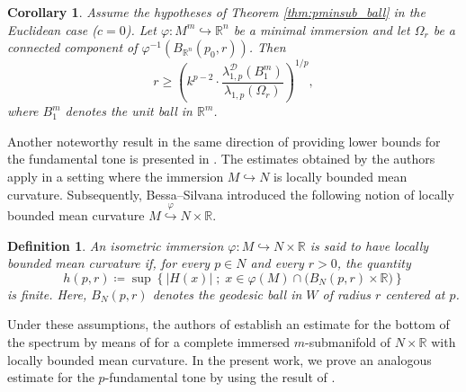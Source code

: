 \documentclass{article}
\newtheorem{cor}[thm]{Corollary}
\newtheorem{definition}[thm]{Definition}
\begin{document}
\begin{cor}\label{radiuscor}
Assume the hypotheses of Theorem \ref{thm:pminsub_ball}
in the Euclidean case ($c=0$).
Let $\varphi : M^m \hookrightarrow \mathbb{R}^n$ be a minimal immersion and let 
$\Omega_{r}$ be a connected component of 
$\varphi^{-1}(B_{\mathbb{R}^n}(p_0,r))$.
Then
\[
r \geq \left( k^{p-2} \cdot \frac{\lambda_{1,p}^{\mathcal D}(B_1^m)}{\lambda_{1,p}(\Omega_{r})}\right)^{1/p},
\]
where $B_1^m$ denotes the unit ball in $\mathbb{R}^m$.
\end{cor} 

Another noteworthy result in the same direction of providing lower bounds for the fundamental tone is presented in \cite{BessaMontenegro2003}. The estimates obtained by the authors apply in a setting where the immersion $M \hookrightarrow N$ is locally bounded mean curvature. 
Subsequently, Bessa--Silvana \cite[Definition 1.5]{Bessa-Silvana} introduced the following notion of locally  bounded mean curvature $M \stackrel{\varphi}{\hookrightarrow} N\times\mathbb{R} $.
\begin{definition}
An isometric immersion $\varphi \colon M \hookrightarrow N \times \mathbb{R}$ is said to have locally bounded mean curvature if, for every $p \in N$ and every $r>0$, the quantity
\[
h(p,r) \coloneqq 
\sup \left\{ |H(x)| \; ; \; x \in \varphi(M)\cap \bigl( B_N(p,r)\times \mathbb{R} \bigr) \right\}
\]
is finite. Here, $B_N(p,r)$ denotes the geodesic ball in $W$ of radius $r$ centered at $p$.
\end{definition} 
Under these assumptions, the authors of \cite[Theorem 1.6]{Bessa-Silvana} establish an estimate for the bottom of the spectrum by means of \cite[Lemma 2.3]{BessaMontenegro2003} for a complete immersed $m$-submanifold of $N \times \mathbb{R}$ with
locally bounded mean curvature. In the present work, we prove an analogous estimate for the $p$-fundamental tone by using the result of \cite[Theorem 1.1]{LimaMontenegroSantos2010}.
\end{document}
